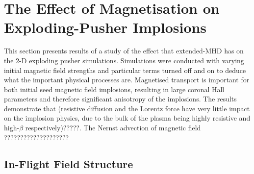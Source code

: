 \section{The Effect of Magnetisation on Exploding-Pusher Implosions}%
\label{sec:Res2_mag_unmag}

This section presents results of a study of the effect that extended-\ac{MHD} has on the 2-D exploding pusher simulations.
Simulations were conducted with varying initial magnetic field strengths and particular terms turned off and on to deduce what the important physical processes are.
Magnetised transport is important for both initial seed magnetic field implosions, resulting in large coronal Hall parameters and therefore significant anisotropy of the implosions.
The results demonstrate that (resistive diffusion and the Lorentz force have very little impact on the implosion physics, due to the bulk of the plasma being highly resistive and high-$\beta$ respectively)?????.
The Nernst advection of magnetic field ????????????????????


\subsection{In-Flight Field Structure}%
\label{sec:Res2_field_structure}


